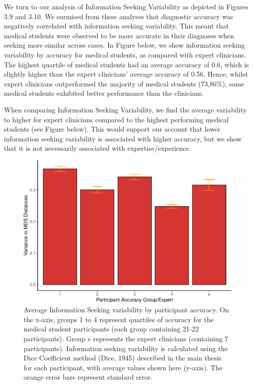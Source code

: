 \documentclass[a4paper, nobind]{templates/ociamthesis}
\begin{document}
We turn to our analysis of Information Seeking Variability as depicted in Figures 3.9 and 3.10. We surmised from these analyses that diagnostic accuracy was negatively correlated with information seeking variability. This meant that medical students were observed to be more accurate in their diagnoses when seeking more similar across cases. In Figure below, we show information seeking variability by accuracy for medical students, as compared with expert clinicians. The highest quartile of medical students had an average accuracy of 0.6, which is slightly higher than the expert clinicians' average accuracy of 0.56. Hence, whilst expert clinicians outperformed the majority of medical students (73,86\%), some medical students exhibited better performance than the clinicians.

\hfill\break
When comparing Information Seeking Variability, we find the average variability to higher for expert clinicians compared to the highest performing medical students (see Figure below). This would support our account that lower information seeking variability is associated with higher accuracy, but we show that it is not necessarily associated with expertise/experience.

\newpage

\begin{figure}[H]

{\centering \includegraphics[width=1\linewidth]{_main_files/figure-latex/accVarExpPlot-1} 

}

\caption[Online Study Appendix: Expert Information Seeking Variabiity by Accuracy (Bar Graph)]{Average Information Seeking variability by participant accuracy. On the x-axis, groups 1 to 4 represent quartiles of accuracy for the medical student participants (each group containing 21-22 participants). Group e represents the expert clinicians (containing 7 participants). Information seeking variability is calculated using the Dice Coefficient method (Dice, 1945) described in the main thesis for each participant, with average values shown here (y-axis). The orange error bars represent standard error.}\label{fig:accVarExpPlot}
\end{figure}
\end{document}
